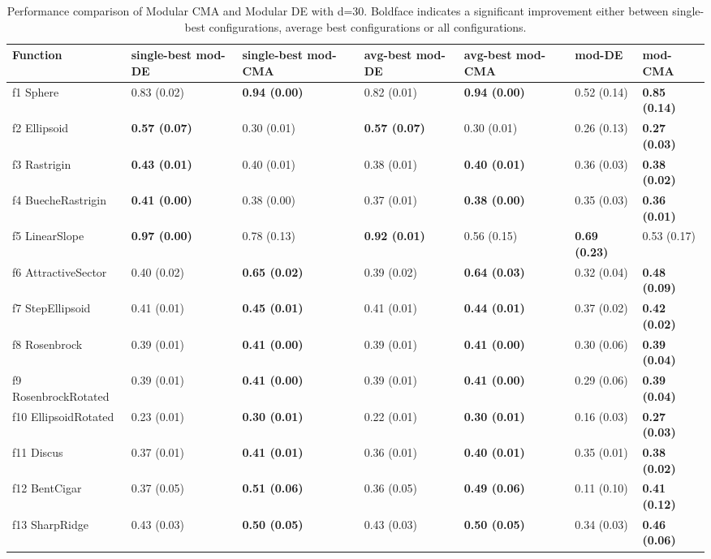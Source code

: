 \begin{table}
\caption{Performance comparison of Modular CMA and Modular DE with d=30. Boldface indicates a significant improvement either between single-best configurations, average best configurations or all configurations.}
\begin{tabular}{lllllll}
\toprule
Function & single-best mod-DE & single-best mod-CMA & avg-best mod-DE & avg-best mod-CMA & mod-DE & mod-CMA \\
\midrule
f1 Sphere & 0.83 (0.02) & \textbf{0.94 (0.00)} & 0.82 (0.01) & \textbf{0.94 (0.00)} & 0.52 (0.14) & \textbf{0.85 (0.14)} \\
f2 Ellipsoid & \textbf{0.57 (0.07)} & 0.30 (0.01) & \textbf{0.57 (0.07)} & 0.30 (0.01) & 0.26 (0.13) & \textbf{0.27 (0.03)} \\
f3 Rastrigin & \textbf{0.43 (0.01)} & 0.40 (0.01) & 0.38 (0.01) & \textbf{0.40 (0.01)} & 0.36 (0.03) & \textbf{0.38 (0.02)} \\
f4 BuecheRastrigin & \textbf{0.41 (0.00)} & 0.38 (0.00) & 0.37 (0.01) & \textbf{0.38 (0.00)} & 0.35 (0.03) & \textbf{0.36 (0.01)} \\
f5 LinearSlope & \textbf{0.97 (0.00)} & 0.78 (0.13) & \textbf{0.92 (0.01)} & 0.56 (0.15) & \textbf{0.69 (0.23)} & 0.53 (0.17) \\
f6 AttractiveSector & 0.40 (0.02) & \textbf{0.65 (0.02)} & 0.39 (0.02) & \textbf{0.64 (0.03)} & 0.32 (0.04) & \textbf{0.48 (0.09)} \\
f7 StepEllipsoid & 0.41 (0.01) & \textbf{0.45 (0.01)} & 0.41 (0.01) & \textbf{0.44 (0.01)} & 0.37 (0.02) & \textbf{0.42 (0.02)} \\
f8 Rosenbrock & 0.39 (0.01) & \textbf{0.41 (0.00)} & 0.39 (0.01) & \textbf{0.41 (0.00)} & 0.30 (0.06) & \textbf{0.39 (0.04)} \\
f9 RosenbrockRotated & 0.39 (0.01) & \textbf{0.41 (0.00)} & 0.39 (0.01) & \textbf{0.41 (0.00)} & 0.29 (0.06) & \textbf{0.39 (0.04)} \\
f10 EllipsoidRotated & 0.23 (0.01) & \textbf{0.30 (0.01)} & 0.22 (0.01) & \textbf{0.30 (0.01)} & 0.16 (0.03) & \textbf{0.27 (0.03)} \\
f11 Discus & 0.37 (0.01) & \textbf{0.41 (0.01)} & 0.36 (0.01) & \textbf{0.40 (0.01)} & 0.35 (0.01) & \textbf{0.38 (0.02)} \\
f12 BentCigar & 0.37 (0.05) & \textbf{0.51 (0.06)} & 0.36 (0.05) & \textbf{0.49 (0.06)} & 0.11 (0.10) & \textbf{0.41 (0.12)} \\
f13 SharpRidge & 0.43 (0.03) & \textbf{0.50 (0.05)} & 0.43 (0.03) & \textbf{0.50 (0.05)} & 0.34 (0.03) & \textbf{0.46 (0.06)} \\

\end{tabular}
\end{table}
